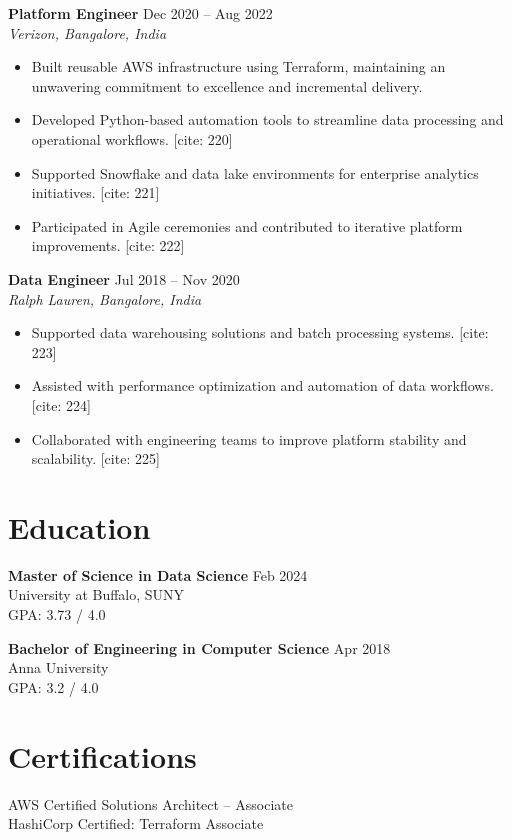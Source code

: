 \documentclass[10pt]{article}
\begin{document}
\textbf{Platform Engineer} \hfill Dec 2020 -- Aug 2022 \\
\textit{Verizon, Bangalore, India}
\begin{itemize}[leftmargin=*, itemsep=3pt]
    \item Built reusable AWS infrastructure using Terraform, maintaining an unwavering commitment to excellence and incremental delivery. 
    \item Developed Python-based automation tools to streamline data processing and operational workflows. [cite: 220]
    \item Supported Snowflake and data lake environments for enterprise analytics initiatives. [cite: 221]
    \item Participated in Agile ceremonies and contributed to iterative platform improvements. [cite: 222]
\end{itemize}

\textbf{Data Engineer} \hfill Jul 2018 -- Nov 2020 \\
\textit{Ralph Lauren, Bangalore, India}
\begin{itemize}[leftmargin=*, itemsep=3pt]
    \item Supported data warehousing solutions and batch processing systems. [cite: 223]
    \item Assisted with performance optimization and automation of data workflows. [cite: 224]
    \item Collaborated with engineering teams to improve platform stability and scalability. [cite: 225]
\end{itemize}

\section*{Education}

\textbf{Master of Science in Data Science} \hfill Feb 2024 \\
University at Buffalo, SUNY \\
GPA: 3.73 / 4.0

\textbf{Bachelor of Engineering in Computer Science} \hfill Apr 2018 \\
Anna University \\
GPA: 3.2 / 4.0

\section*{Certifications}
AWS Certified Solutions Architect – Associate \\
HashiCorp Certified: Terraform Associate
\end{document}
